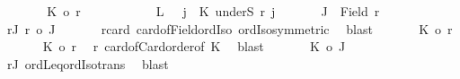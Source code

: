 \begin{isabellebody}
\ \ \ \ \isamarkupfalse%
\ \isamarkupfalse%
\ {\isachardoublequoteopen}{\isacharbar}{\kern0pt}K{\isacharbar}{\kern0pt}\ {\isasymle}o\ {\isacharquery}{\kern0pt}r{\isacharprime}{\kern0pt}{\isachardoublequoteclose}\ \isacommand{{\isachardot}{\kern0pt}}\isamarkupfalse%
\isanewline
\ \ \ \ \isamarkupfalse%
\isanewline
\ \ \ \ \isacommand{{\isacharbraceleft}{\kern0pt}}\isamarkupfalse%
\isamarkupfalse%
\ {\isacharquery}{\kern0pt}L\ {\isacharequal}{\kern0pt}\ {\isachardoublequoteopen}{\isasymUnion}\ j\ {\isasymin}\ K{\isachardot}{\kern0pt}\ underS\ {\isacharquery}{\kern0pt}r{\isacharprime}{\kern0pt}\ j{\isachardoublequoteclose}\isanewline
\ \ \ \ \ \isamarkupfalse%
\ {\isacharquery}{\kern0pt}J\ {\isacharequal}{\kern0pt}\ {\isachardoublequoteopen}Field\ r{\isachardoublequoteclose}\isanewline
\ \ \ \ \ \isamarkupfalse%
\ rJ{\isacharcolon}{\kern0pt}\ {\isachardoublequoteopen}r\ {\isacharequal}{\kern0pt}o\ {\isacharbar}{\kern0pt}{\isacharquery}{\kern0pt}J{\isacharbar}{\kern0pt}{\isachardoublequoteclose}\isanewline
\ \ \ \ \ \isamarkupfalse%
\ r{\isacharunderscore}{\kern0pt}card\ card{\isacharunderscore}{\kern0pt}of{\isacharunderscore}{\kern0pt}Field{\isacharunderscore}{\kern0pt}ordIso\ ordIso{\isacharunderscore}{\kern0pt}symmetric\ \isamarkupfalse%
\ blast\isanewline
\ \ \ \ \ \isamarkupfalse%
\ {\isachardoublequoteopen}{\isacharbar}{\kern0pt}K{\isacharbar}{\kern0pt}\ {\isacharless}{\kern0pt}o\ {\isacharquery}{\kern0pt}r{\isacharprime}{\kern0pt}{\isachardoublequoteclose}\isanewline
\ \ \ \ \ \isamarkupfalse%
\ {\isachardoublequoteopen}{\isacharbar}{\kern0pt}K{\isacharbar}{\kern0pt}\ {\isacharless}{\kern0pt}{\isacharequal}{\kern0pt}o\ r{\isachardoublequoteclose}\ \isamarkupfalse%
\ r{\isacharprime}{\kern0pt}\ card{\isacharunderscore}{\kern0pt}of{\isacharunderscore}{\kern0pt}Card{\isacharunderscore}{\kern0pt}order{\isacharbrackleft}{\kern0pt}of\ K{\isacharbrackright}{\kern0pt}\ \isamarkupfalse%
\ blast\isanewline
\ \ \ \ \ \isamarkupfalse%
\ {\isachardoublequoteopen}{\isacharbar}{\kern0pt}K{\isacharbar}{\kern0pt}\ {\isasymle}o\ {\isacharbar}{\kern0pt}{\isacharquery}{\kern0pt}J{\isacharbar}{\kern0pt}{\isachardoublequoteclose}\ \isamarkupfalse%
\ rJ\ ordLeq{\isacharunderscore}{\kern0pt}ordIso{\isacharunderscore}{\kern0pt}trans\ \isamarkupfalse%
\ blast\isanewline
\ \ \ \ \ \isamarkupfalse%
\isanewline

\end{isabellebody}

